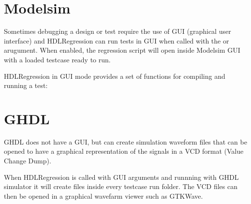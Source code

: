 \documentclass[letterpaper,10pt,english]{sphinxmanual}
\let\sphinxpxdimen\pdfpxdimen\else\newdimen\sphinxpxdimen
\begin{document}
\section{Modelsim}
\label{\detokenize{gui:modelsim}}
\sphinxAtStartPar
Sometimes debugging a design or test require the use of GUI (graphical user interface)
and HDLRegression can run tests in GUI when called with the  or  arugument.
When enabled, the regression script will open inside Modelsim GUI with a loaded testcase ready to run.

\begin{sphinxVerbatim}[commandchars=\\\{\}]
\end{sphinxVerbatim}

\sphinxAtStartPar
HDLRegression in GUI mode provides a set of functions for compiling and running a
test:

\noindent{\hspace*{\fill}\sphinxincludegraphics[width=550\sphinxpxdimen]{{gui_menu}.png}\hspace*{\fill}}


\section{GHDL}
\label{\detokenize{gui:ghdl}}
\sphinxAtStartPar
GHDL does not have a GUI, but can create simulation waveform files that can be opened to have a graphical representation
of the signals in a VCD format (Value Change Dump).

\sphinxAtStartPar
When HDLRegression is called with GUI arguments and runnning with GHDL simulator it will create  files
inside every testcase run folder. The VCD files can then be opened in a graphical wavefarm viewer such as GTKWave.

\begin{sphinxVerbatim}[commandchars=\\\{\}]
\end{sphinxVerbatim}
\end{document}
